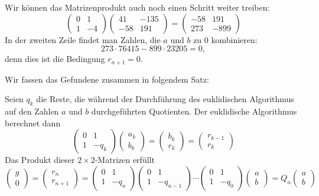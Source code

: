\begin{beispiel}
Wir können das Matrizenprodukt auch noch einen Schritt weiter treiben:
\[
\begin{pmatrix} 0 & 1 \\ 1 & -4 \end{pmatrix}
\begin{pmatrix} 41 & -135 \\ -58 & 191 \end{pmatrix}
=
\begin{pmatrix} -58 & 191 \\ 273 & -899 \end{pmatrix}
\]
In der zweiten Zeile findet man Zahlen, die $a$ und $b$ zu 0 kombinieren:
\[
273 \cdot 76415 - 899 \cdot 23205 = 0,
\]
denn dies ist die Bedingung $r_{n+1} = 0$.
\end{beispiel}

Wir fassen das Gefundene zusammen in folgendem Satz:

\begin{satz}
Seien $q_k$ die Reste, die während der Durchführung des euklidischen
Algorithmus auf den Zahlen $a$ und $b$ durchgeführten Quotienten.
Der euklidische Algorithmus berechnet dann
\[
\begin{pmatrix} 0 & 1 \\ 1 & -q_k \end{pmatrix}
\begin{pmatrix} a_k \\ b_k \end{pmatrix}
=
\begin{pmatrix} b_k \\ r_k \end{pmatrix}
=
\begin{pmatrix} r_{k-1} \\ r_k \end{pmatrix}
\]
Das Produkt dieser $2\times 2$-Matrizen erfüllt
\[
\begin{pmatrix}g\\0\end{pmatrix}
=
\begin{pmatrix}r_n\\r_{n+1}\end{pmatrix}
=
\begin{pmatrix} 0&1 \\ 1&-q_n\end{pmatrix}
\begin{pmatrix} 0&1 \\ 1&-q_{n-1}\end{pmatrix}
\cdots
\begin{pmatrix} 0&1 \\ 1&-q_{0}\end{pmatrix}
\begin{pmatrix}a\\b\end{pmatrix}
=
Q_n
\begin{pmatrix}a\\b\end{pmatrix}
\]
\end{satz}

